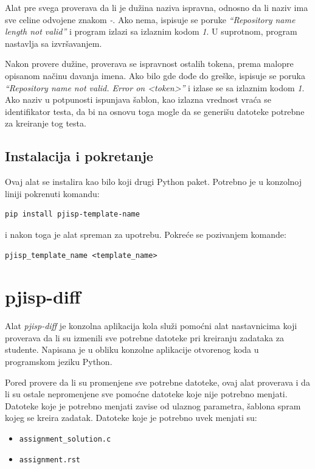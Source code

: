 \documentclass[12pt]{report}
\begin{document}
Alat pre svega proverava da li je dužina naziva ispravna, odnosno da li naziv ima sve celine odvojene znakom \textit{-}. Ako nema, ispisuje se poruke \textit{``Repository name length not valid''} i program izlazi sa izlaznim kodom \textit{1}. U suprotnom, program nastavlja sa izvršavanjem.

Nakon provere dužine, proverava se ispravnost ostalih tokena, prema malopre opisanom načinu davanja imena. Ako bilo gde dođe do greške, ispisuje se poruka  \textit{``Repository name not valid. Error on <token>''} i izlase se sa izlaznim kodom \textit{1}. Ako naziv u potpunosti ispunjava šablon, kao izlazna vrednost vraća se identifikator testa, da bi na osnovu toga mogle da se generišu datoteke potrebne za kreiranje tog testa.

\subsection{Instalacija i pokretanje}
Ovaj alat se instalira kao bilo koji drugi Python paket. Potrebno je u konzolnoj liniji pokrenuti komandu:

\begin{verbatim}
pip install pjisp-template-name
\end{verbatim}

i nakon toga je alat spreman za upotrebu. Pokreće se pozivanjem komande:

\begin{verbatim}
pjisp_template_name <template_name>
\end{verbatim}

\section{pjisp-diff}

Alat \textit{pjisp-diff} \cite{pjisp-diff} je konzolna aplikacija kola služi pomoćni alat nastavnicima koji proverava da li su izmenili sve potrebne datoteke pri kreiranju zadataka za studente. Napisana je u obliku konzolne aplikacije otvorenog koda u programskom jeziku Python.

Pored provere da li su promenjene sve potrebne datoteke, ovaj alat proverava i da li su ostale nepromenjene sve pomoćne datoteke koje nije potrebno menjati. Datoteke koje je potrebno menjati zavise od ulaznog parametra, šablona spram kojeg se kreira zadatak. Datoteke koje je potrebno uvek menjati su:

\begin{itemize}
    \item \texttt{assignment\_solution.c}
    \item \texttt{assignment.rst}
\end{itemize}
\end{document}
